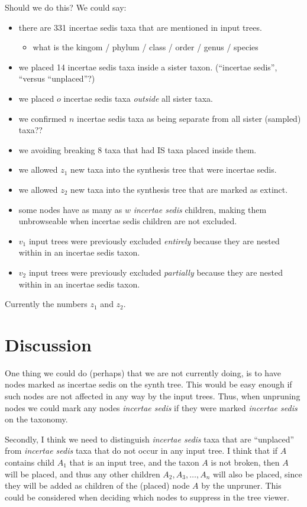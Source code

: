 \documentclass[english]{article}
\begin{document}
Should we do this? We could say:  \begin{itemize} \item there are 331
incertae sedis taxa that are mentioned in input trees. \begin{itemize}
\item what is the kingom / phylum / class / order / genus / species
\end{itemize} \item we placed 14 incertae sedis taxa inside a sister
taxon. (``incertae sedis'', ``versus ``unplaced''?) \item we placed
$o$ incertae sedis taxa \emph{outside} all sister taxa. \item we
confirmed $n$ incertae sedis taxa as being separate from all sister
(sampled) taxa?? \item we avoiding breaking 8 taxa that had IS taxa
placed inside them. \item we allowed $z_{1}$ new taxa into the
synthesis tree that were incertae sedis. \item we allowed $z_{2}$ new
taxa into the synthesis tree that are marked as extinct. \item some
nodes have as many as $w$\emph{ incertae sedis} children, making them
unbrowseable when incertae sedis children are not excluded. \item
$v_{1}$ input trees were previously excluded \emph{entirely} because
they are nested within in an incertae sedis taxon. \item $v_{2}$ input
trees were previously excluded \emph{partially} because they are
nested within in an incertae sedis taxon. \end{itemize} Currently the
numbers $z_{1}$ and $z_{2}$.

\section{Discussion}

One thing we could do (perhaps) that we are not currently doing, is to
have nodes marked as incertae sedis on the synth tree. This would be
easy enough if such nodes are not affected in any way by the input
trees. Thus, when unpruning nodes we could mark any nodes
\emph{incertae sedis} if they were marked \emph{incertae sedis} on the
taxonomy.

Secondly, I think we need to distinguish \emph{incertae sedis} taxa
that are ``unplaced'' from \emph{incertae sedis} taxa that do not
occur in any input tree. I think that if $A$ contains child $A_{1}$
that is an input tree, and the taxon $A$ is not broken, then $A$ will
be placed, and thus any other children $A_{2},A_{3},\ldots,A_{n}$ will
also be placed, since they will be added as children of the (placed)
node $A$ by the unpruner. This could be considered when deciding which
nodes to suppress in the tree viewer.
\end{document}
